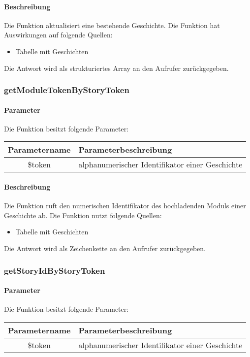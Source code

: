 \paragraph{Beschreibung} Die Funktion aktualisiert eine bestehende Geschichte. Die Funktion hat Auswirkungen auf folgende Quellen:
\begin{itemize}
	\item Tabelle mit Geschichten
\end{itemize}
Die Antwort wird als strukturiertes Array an den Aufrufer zurückgegeben.
\subsubsection{getModuleTokenByStoryToken}
\paragraph{Parameter} Die Funktion besitzt folgende Parameter:
\begin{table}[H]
	\begin{tabular}{|c|p{11cm}|}
		\hline
		\textbf{Parametername} & \textbf{Parameterbeschreibung} \\ \hline
		\$token & alphanumerischer Identifikator einer Geschichte \\ \hline
	\end{tabular}
\end{table}
\paragraph{Beschreibung} Die Funktion ruft den numerischen Identifikator des hochladenden Moduls einer Geschichte ab. Die Funktion nutzt folgende Quellen:
\begin{itemize}
	\item Tabelle mit Geschichten
\end{itemize}
Die Antwort wird als Zeichenkette an den Aufrufer zurückgegeben.
\subsubsection{getStoryIdByStoryToken}
\paragraph{Parameter} Die Funktion besitzt folgende Parameter:
\begin{table}[H]
	\begin{tabular}{|c|p{11cm}|}
		\hline
		\textbf{Parametername} & \textbf{Parameterbeschreibung} \\ \hline
		\$token & alphanumerischer Identifikator einer Geschichte \\ \hline
	\end{tabular}
\end{table}
